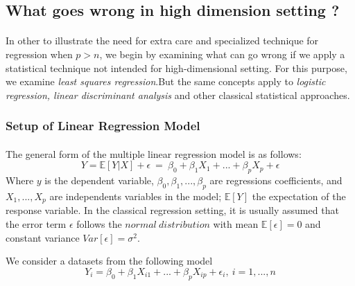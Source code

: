 \documentclass[12pt]{report}
\renewcommand{\emph}{\textit}
\begin{document}
	\subsection{What goes wrong in high dimension setting ?}
	\paragraph*{}
	In other to illustrate the need for extra care and specialized technique for regression when $p>n$, we begin by examining what can go wrong if we apply a statistical technique not intended for high-dimensional setting. For this purpose, we examine \textit{least squares regression}.But the same concepts apply to \emph{logistic regression, linear discriminant analysis} and other classical statistical approaches.
	\begin{center}
		\subsubsection{Setup of Linear Regression Model}
	\end{center}
	
	\paragraph*{}
	The general form of the multiple linear regression model is as follows:
	\begin{equation}
		Y=\mathbb{E}[Y|X] + \epsilon\ =\ \beta_{0}+\beta_{1}X_{1}+...+ \beta_{p}X_{p} + \epsilon
		\label{f1}
	\end{equation}
	Where $y$ is the dependent variable, $\beta_{0}, \beta_{1},...,\beta_{p}$ are regressions coefficients, and $X_{1},...,X_{p}$ are independents variables in the model; $\mathbb{E}[Y]$ the expectation of the response variable. In the classical regression setting, it is usually assumed that the error term $\epsilon$ follows the $normal\ distribution$ with mean $\mathbb{E}[\epsilon]=0$ and constant variance $Var[\epsilon]=\sigma^{2}$.
	
	We consider  a datasets from the following model
	\begin{equation}
		Y_{i}=\beta_{0} + \beta_{1}X_{i1}+...+\beta_{p}X_{ip}+\epsilon_{i},\: i=1,...,n
		\label{f2}
	\end{equation}
	
\end{document}
